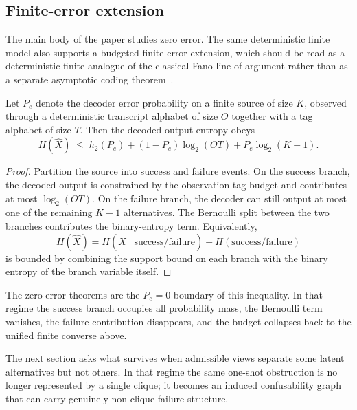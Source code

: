 \subsection{Finite-error extension}\label{sec:finite-error-extension}

The main body of the paper studies zero error. The same deterministic finite model also supports a budgeted finite-error extension, which should be read as a deterministic finite analogue of the classical Fano line of argument rather than as a separate asymptotic coding theorem~\cite{fano1961transmission,witsenhausen1975conditional,cover2006elements,kelly2011improved}.

\begin{proposition}\label{thm:finite-error-budgeted}
Let $P_e$ denote the decoder error probability on a finite source of size $K$, observed through a deterministic transcript alphabet of size $O$ together with a tag alphabet of size $T$. Then the decoded-output entropy obeys
\[
H(\hat X)
\;\le\;
h_2(P_e) + (1-P_e)\log_2 (OT) + P_e \log_2 (K-1).
\]
\end{proposition}

\begin{proof}
Partition the source into success and failure events. On the success branch, the decoded output is constrained by the observation-tag budget and contributes at most $\log_2(OT)$. On the failure branch, the decoder can still output at most one of the remaining $K-1$ alternatives. The Bernoulli split between the two branches contributes the binary-entropy term. Equivalently,
\[
H(\hat X)=H(\hat X \mid \text{success/failure}) + H(\text{success/failure})
\]
is bounded by combining the support bound on each branch with the binary entropy of the branch variable itself.
\end{proof}

The zero-error theorems are the $P_e=0$ boundary of this inequality. In that regime the success branch occupies all probability mass, the Bernoulli term vanishes, the failure contribution disappears, and the budget collapses back to the unified finite converse above.

The next section asks what survives when admissible views separate some latent alternatives but not others. In that regime the same one-shot obstruction is no longer represented by a single clique; it becomes an induced confusability graph that can carry genuinely non-clique failure structure.
